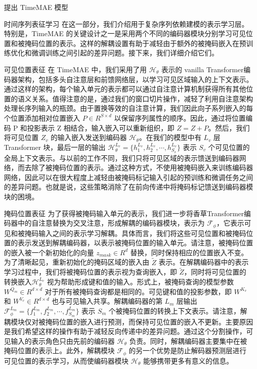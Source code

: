 \documentclass[a4paper,12pt]{article}
\begin{document}
\begin{section}{提出 TimeMAE 模型}
\begin{subsection}{时间序列表征学习}
在这一部分，我们介绍用于复杂序列依赖建模的表示学习层。特别是，TimeMAE 的关键设计之一是采用两个不同的编码器模块分别学习可见位置和被掩码位置的表示。这样的解耦设置有助于减轻由于额外的被掩码嵌入在预训练优化和微调训练之间引起的差异问题。接下来，我们详细介绍它们。
\begin{subsubsection}{可见位置表征}
在 TimeMAE 中，我们采用了用 $\mathcal{H}_\theta$ 表示的 vanilla Transformer编码器架构，包括多头自注意层和前馈网络层，以学习可见区域输入的上下文表示。通过这样的架构，每个输入单元的表示都可以通过自注意计算机制获得所有其他位置的语义关系。值得注意的是，通过我们的窗口切片操作，减轻了利用自注意架构处理长序列输入的瓶颈。由于置换等效的自注意计算，我们因此向子系列嵌入的每个位置添加相对位置嵌入 $P \in R^{S×d}$ 以保留序列属性的顺序。因此，通过将位置编码 P 和投影表示 Z 相结合，输入嵌入可以重新组织，即 $Z = Z + P$。然后，我们将可见位置 $Z_v$ 的输入嵌入发送到编码器 $\mathcal{H}_\theta$。在我们的模型中有 $L_v$ 层 Transformer 块，最后一层的输出 $\mathcal{H}_\theta^{L_v} = \{h_1^{L_v}, h_2^{L_v}, \cdots, h_{S_v}^{L_v}\}$
表示 $S_v$ 个可见位置的全局上下文表示。与以前的工作不同，我们只将可见区域的表示馈送到编码器网络，而去除了被掩码位置的表示。通过这种方式，不使用被掩码嵌入来训练编码器网络，因此可以在很大程度上减轻由被掩码标记输入引起的预训练和微调任务之间的差异问题。也就是说，这些策略消除了在前向传递中将掩码标记馈送到编码器模块的困境。
\end{subsubsection}
\begin{subsubsection}{掩码位置表征}
为了获得被掩码输入单元的表示，我们进一步将香草Transformer编码器中的自注意替换为交叉注意，形成解耦的编码器模块，表示为 $\mathcal{F}_{\phi}$，它表示可见和被掩码输入之间的表示学习解耦。具体而言，我们将这些可见位置和被掩码位置的表示发送到解耦编码器，以表示被掩码位置的输入单元。请注意，被掩码位置的嵌入被一个新初始化的向量 $z_{mask} \in R^d$ 替换，同时保持相应的位置嵌入不变。为了清晰起见，重新初始化的掩码区域的嵌入由 $ \widetilde{Z}$ 表示。在解耦编码器中的表示学习过程中，我们将被掩码位置的表示视为查询嵌入，即 $\widetilde{Z}$，同时将可见位置的转换嵌入$\mathcal{H}_\theta^{L_v}$ 视为帮助形成键和值的输入。形式上，被掩码查询的模型参数 $W^{Q_m} \in R^{d×d}$ 对于所有被掩码查询都是相同的。可见键和值的投影参数，即 $W^{K_v}$ 和 $W^{V_v} \in R^{d×d}$ 也与可见输入共享。解耦编码器的第 $L_m$ 层输出 $\mathcal{F}_{\phi}^{L_m} = \{f_1^{L_m}, f_2^{L_m}, \cdots, f_{S_m}^{L_m}\}$ 表示 $S_m$ 个被掩码位置的转换上下文表示。请注意，解耦模块仅对被掩码位置的嵌入进行预测，而保持可见位置的嵌入不更新。主要原因是我们希望这样的操作有助于减轻反向传递中的差异问题。通过这个分割操作，可见输入的表示角色只由先前的编码器 $\mathcal{H}_\theta$ 负责。同时，解耦编码器主要集中在被掩码位置的表示上。此外，解耦模块 $\mathcal{F}_{\phi}$ 的另一个优势是防止解码器预测层进行可见位置的表示学习，从而使编码器模块 $\mathcal{H}_\theta$ 能够携带更多有意义的信息。
\end{subsubsection}
\end{subsection}


\end{section}
\end{document}
